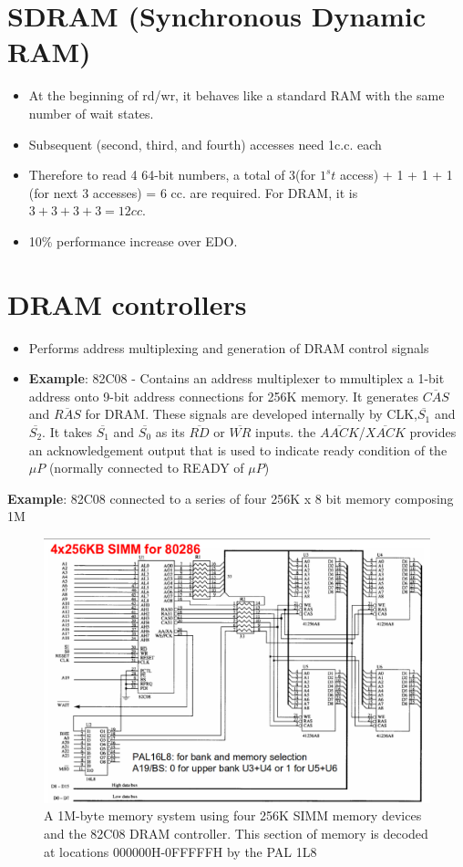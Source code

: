 \section{SDRAM (Synchronous Dynamic RAM)}
\begin{itemize}
  \item At the beginning of rd/wr, it behaves like a standard RAM with the same number of wait states.
  \item Subsequent (second, third, and fourth) accesses need 1c.c. each
  \item Therefore to read 4 64-bit numbers, a total of 3(for $1^st$ access) + 1 + 1 + 1 (for next 3 accesses) = 6 cc. are required. For DRAM, it is $3+3+3+3=12 cc.$
  \item 10\% performance increase over EDO.
\end{itemize}

\section{DRAM controllers}
\begin{itemize}
  \item Performs address multiplexing and generation of DRAM control signals
  \item \textbf{Example}: 82C08 - Contains an address multiplexer to mmultiplex a 1-bit address onto 9-bit address connections for 256K memory. It generates $\overline{CAS}$ and $\overline{RAS}$ for DRAM. These signals are developed internally by CLK,$\overline{S_1}$ and $\overline{S_2}$. It takes $\overline{S_1}$ and $\overline{S_0}$ as its $\overline{RD}$ or $\overline{WR}$ inputs. the $\overline{AACK}$/$\overline{XACK}$ provides an acknowledgement output that is used to indicate ready condition of the $\mu P$ (normally connected to READY of $\mu P$)
\end{itemize}
\textbf{Example}: 82C08 connected to a series of four 256K x 8 bit memory composing 1M
\begin{figure}[h!]
  \centering
  \includegraphics[width = 1.1\textwidth]{./figures/82C08.png}
  \caption{A 1M-byte memory system using four 256K SIMM memory devices and the 82C08 DRAM controller. This section of memory is decoded at locations 000000H-0FFFFFH by the PAL 1L8}
  \label{}
\end{figure}

